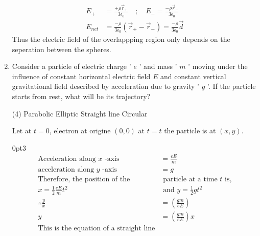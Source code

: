 \begin{enumerate}[label=\color{ocre}\textbf{\arabic*.}]
\begin{answer}
\begin{align*}
	E_{+}&=\frac{+\rho \vec r_{+}}{3\epsilon_{0}}\quad;\quad
	E_{-}=\frac{-\rho \vec r_{-}}{3\epsilon_{0}}\\
		E_{net}&=\frac{-\rho }{3\epsilon_{0}}(\vec r_{+}-\vec r_{-})=\frac{-\rho }{3\epsilon_{0}}\vec{d}
	\end{align*}
	Thus the electric field of the overlappping region only depends on the seperation between the spheres.
\end{answer}
\item Consider a particle of electric charge ' $e$ ' and mass ' $m$ ' moving under the influence of constant horizontal electric field $E$ and constant vertical gravitational field described by acceleration due to gravity ' $g$ '. If the particle starts from rest, what will be its trajectory? 

\begin{tasks}(4)
	\task[\textbf{a.}]Parabolic 
	\task[\textbf{b.}]Elliptic
	\task[\textbf{c.}]Straight line 
	\task[\textbf{d.}]Circular 
\end{tasks}

	\opencutright
	\renewcommand\windowpagestuff{
		\centering\texttt{[image: pset-3(10)]}}
	\begin{answer}
	Let at $t=0$, electron at origine $(0,0)$ at $t=t$ the particle is at $(x, y)$.
		\begin{cutout}{3}{\dimexpr\linewidth-4cm\relax}{0pt}{3}
			\begin{align*}
		\text{Acceleration along $x$ -axis }&= \frac{e E}{m} \\ \text{acceleration along $y$ -axis}&= g\\
		\text{Therefore, the position of the}&\text{  particle at a time $t$ is,}\\ x=\frac{1}{2} \frac{e E}{m} t^{2}&\text{ and  } y=\frac{1}{2} g t^{2}\\
		\therefore  \frac{y}{x} &=\left(\frac{g m}{e E}\right) \\
		y&=\left(\frac{g m}{e E}\right) x\\
		\text{This is the equation of a straight line}
		\end{align*}
		\end{cutout}
		
	\end{answer}
\end{enumerate}
